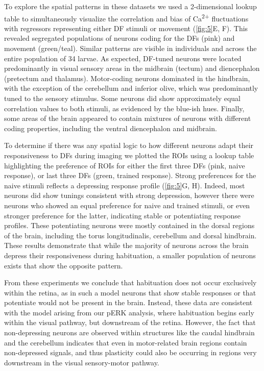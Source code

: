 \documentclass[9pt,lineno]{RandlettLab_elife}
\begin{document}
To explore the spatial patterns in these datasets we used a 2-dimensional lookup table to simultaneously visualize the correlation and bias of Ca\textsuperscript{2+} fluctuations with regressors representing either DF stimuli or movement (\autoref{fig:5}E, F). This revealed segregated populations of neurons coding for the DFs (pink) and movement (green/teal). Similar patterns are visible in individuals and across the entire population of 34 larvae. As expected, DF-tuned neurons were located predominantly in visual sensory areas in the midbrain (tectum) and diencephalon (pretectum and thalamus). Motor-coding neurons dominated in the hindbrain, with the exception of the cerebellum and inferior olive, which was predominantly tuned to the sensory stimulus. Some neurons did show approximately equal correlation values to both stimuli, as evidenced by the blue-ish hues. Finally, some areas of the brain appeared to contain mixtures of neurons with different coding properties, including the ventral diencephalon and midbrain. 

To determine if there was any spatial logic to how different neurons adapt their responsiveness to DFs during imaging we plotted the ROIs using a lookup table highlighting the preference of ROIs for either the first three DFs (pink, naive response), or last three DFs (green, trained response). Strong preferences for the naive stimuli reflects a depressing response profile (\autoref{fig:5}G, H). Indeed, most neurons did show tunings consistent with strong depression, however there were neurons who showed an equal preference for naive and trained stimuli, or even stronger preference for the latter, indicating stable or potentiating response profiles. These potentiating neurons were mostly contained in the dorsal regions of the brain, including the torus longitudinalis, cerebellum and dorsal hindbrain. These results demonstrate that while the majority of neurons across the brain depress their responsiveness during habituation, a smaller population of neurons exists that show the opposite pattern. 

From these experiments we conclude that habituation does not occur exclusively within the retina, as in such a model neurons that show stable responses or that potentiate would not be present in the brain. Instead, these data are consistent with the model arising from our pERK analysis, where habituation begins early within the visual pathway, but downstream of the retina. However, the fact that non-depressing neurons are observed within structures like the caudal hindbrain and the cerebellum indicates that even in motor-related brain regions contain non-depressed signals, and thus plasticity could also be occurring in regions very downstream in the visual sensory-motor pathway.
\pagebreak
\end{document}
